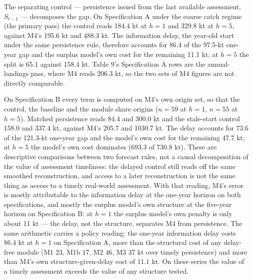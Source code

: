 \documentclass[11pt]{article}
\begin{document}
The separating control --- persistence issued from the last available
assessment, \(S_{t-1}\) --- decomposes the gap. On Specification A under
the coarse catch regime (the primary pass) the control reads 184.4 kt at
\(h = 1\) and 329.8 kt at \(h = 5\), against M4's 195.6 kt and 488.3 kt.
The information delay, the year-old start under the same persistence
rule, therefore accounts for 86.4 of the 97.5-kt one-year gap and the
surplus model's own cost for the remaining 11.1 kt; at \(h = 5\) the
split is 65.1 against 158.4 kt. Table 9's Specification A rows are the
annual-landings pass, where M4 reads 206.3 kt, so the two sets of M4
figures are not directly comparable.

On Specification B every term is computed on M4's own origin set, so
that the control, the baseline and the module share origins (\(n=59\)
at \(h=1\), \(n=55\) at \(h=5\)). Matched persistence reads 84.4 and
300.0 kt and the stale-start control 158.0 and 337.4 kt, against M4's
205.7 and 1030.7 kt. The delay accounts for 73.6 of the 121.3-kt
one-year gap and the model's own cost for the remaining 47.7 kt; at
\(h = 5\) the model's own cost dominates (693.3 of 730.8 kt). These are descriptive comparisons between two
forecast rules, not a causal decomposition of the value of assessment
timeliness: the delayed control still reads off the same smoothed
reconstruction, and access to a later reconstruction is not the same
thing as access to a timely real-world assessment. With that reading,
M4's error is mostly attributable to the information delay at the
one-year horizon on both specifications, and mostly the surplus model's own structure at the
five-year horizon on Specification B: at \(h = 1\) the surplus model's
own penalty is only about 11 kt --- the delay, not the structure,
separates M4 from persistence. The same arithmetic carries a policy reading: the one-year information
delay costs \(86.4\) kt at \(h = 1\) on Specification A, more than the
structural cost of any delay-free module (M1 \(23\), M1b \(17\), M2
\(46\), M3 \(37\) kt over timely persistence) and more than M4's own
structure-given-delay cost of \(11.1\) kt. On these series the value of
a timely assessment exceeds the value of any structure tested.
\end{document}
